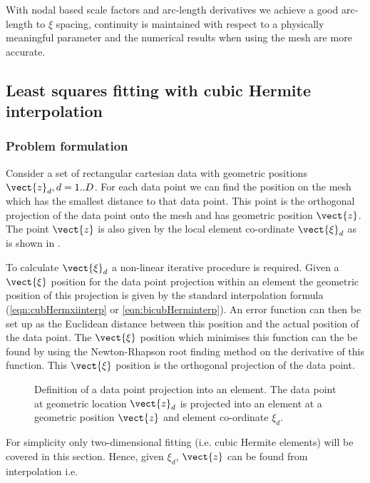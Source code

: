 With nodal based scale factors and arc-length derivatives we achieve a good
arc-length to $\xi$ spacing, continuity is maintained with respect to a
physically meaningful parameter and the numerical results when using the mesh
are more accurate.

\subsection{Least squares fitting with cubic Hermite interpolation}

\subsubsection{Problem formulation}

Consider a set of rectangular cartesian data with geometric positions
$\vect{z}_{d},d=1..D$. For each data point we can find the position on the mesh
which has the smallest distance to that data point. This point is the
orthogonal projection of the data point onto the mesh and has geometric
position $\vect{z}$. The point $\vect{z}$ is also given by the local element
co-ordinate $\vect{\xi}_{d}$ as is shown in .

To calculate $\vect{\xi}_{d}$ a non-linear iterative procedure is required.
Given a $\vect{\xi}$ position for the data point projection within an element
the geometric position of this projection is given by the standard
interpolation formula (\eqref{eqn:cubHermxiinterp} or
\eqref{eqn:bicubHerminterp}). An error function can then be set up as the
Euclidean distance between this position and the actual position of the data
point. The $\vect{\xi}$ position which minimises this function can the be found
by using the Newton-Rhapson root finding method on the derivative of this
function. This $\vect{\xi}$ position is the orthogonal projection of the data
point.

\begin{figure} \centering
  
  \caption{Definition of a data point projection into an element. The data
    point at geometric location $\vect{z}_{d}$ is projected into an element at a
    geometric position $\vect{z}$ and element co-ordinate $\xi_{d}$.}
  \label{fig:dataproj}
\end{figure}

For simplicity only two-dimensional fitting (i.e. cubic Hermite elements) will
be covered in this section. Hence, given $\xi_{d}$, $\vect{z}$ can be found from
interpolation i.e.
\begin{equation}
  \label{eqn:datapointpos}
\end{equation}

